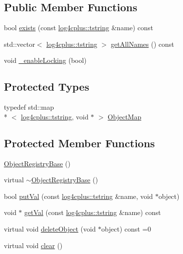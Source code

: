 \subsection*{Public Member Functions}
\begin{DoxyCompactItemize}
\item 
bool \hyperlink{classlog4cplus_1_1spi_1_1ObjectRegistryBase_aee164a34638f92f573e452491f0654c4}{exists} (const \hyperlink{namespacelog4cplus_a3c9287f6ebcddc50355e29d71152117b}{log4cplus\-::tstring} \&name) const 
\item 
std\-::vector$<$ \hyperlink{namespacelog4cplus_a3c9287f6ebcddc50355e29d71152117b}{log4cplus\-::tstring} $>$ \hyperlink{classlog4cplus_1_1spi_1_1ObjectRegistryBase_ae642ab65b0f0d4846491609075173b92}{get\-All\-Names} () const 
\item 
void \hyperlink{classlog4cplus_1_1spi_1_1ObjectRegistryBase_a9eb0cfea4745c68d8286ad1312b59fb5}{\-\_\-enable\-Locking} (bool)
\end{DoxyCompactItemize}
\subsection*{Protected Types}
\begin{DoxyCompactItemize}
\item 
typedef std\-::map\\*
$<$ \hyperlink{namespacelog4cplus_a3c9287f6ebcddc50355e29d71152117b}{log4cplus\-::tstring}, void $\ast$ $>$ \hyperlink{classlog4cplus_1_1spi_1_1ObjectRegistryBase_a5fe808425932ecd49349e063894dd3e6}{Object\-Map}
\end{DoxyCompactItemize}
\subsection*{Protected Member Functions}
\begin{DoxyCompactItemize}
\item 
\hyperlink{classlog4cplus_1_1spi_1_1ObjectRegistryBase_a0d7c935c7d36f1b9c72922995e5f09cd}{Object\-Registry\-Base} ()
\item 
virtual \hyperlink{classlog4cplus_1_1spi_1_1ObjectRegistryBase_a9a05598a9bbf1c7356507216718d6b3c}{$\sim$\-Object\-Registry\-Base} ()
\item 
bool \hyperlink{classlog4cplus_1_1spi_1_1ObjectRegistryBase_a4a4ab8eb23b2e611e6d282ea1275ebf7}{put\-Val} (const \hyperlink{namespacelog4cplus_a3c9287f6ebcddc50355e29d71152117b}{log4cplus\-::tstring} \&name, void $\ast$object)
\item 
void $\ast$ \hyperlink{classlog4cplus_1_1spi_1_1ObjectRegistryBase_a6103a7bf84fc877f73e8d0bd979c8584}{get\-Val} (const \hyperlink{namespacelog4cplus_a3c9287f6ebcddc50355e29d71152117b}{log4cplus\-::tstring} \&name) const 
\item 
virtual void \hyperlink{classlog4cplus_1_1spi_1_1ObjectRegistryBase_ac433a6bb595f4e6147f5b7d2befeb63f}{delete\-Object} (void $\ast$object) const =0
\item 
virtual void \hyperlink{classlog4cplus_1_1spi_1_1ObjectRegistryBase_ad4d253e58cfd4c7d5f688e9a300393db}{clear} ()
\end{DoxyCompactItemize}
